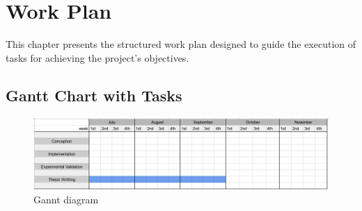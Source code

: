 %

\chapter{Work Plan}
\label{Work Plan}

This chapter presents the structured work plan designed to guide the execution of tasks for achieving the project's objectives.

\section{Gantt Chart with Tasks}

\begin{figure}
    \centering
    \includegraphics[width=1\linewidth]{Chapters/Figures/Gannt.png}
    \caption{Gannt diagram}
    \label{fig:enter-label}
\end{figure}